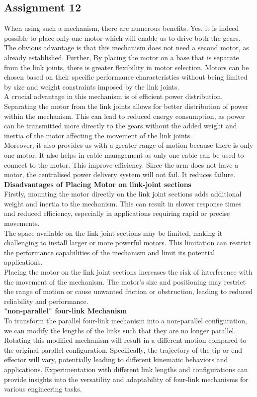 \documentclass[12pt,a4paper]{report}
\begin{document}
\subsection{\textbf{Assignment 12}}
When using such a mechanism, there are numerous benefits. Yes, it is indeed possible to place only one motor 
which will enable us to drive both the gears. \\
The obvious advantage is that this mechanism does not need a second motor, as already established. 
Further, By placing the motor on a base that is separate from the link joints, there is greater flexibility in motor selection. 
Motors can be chosen based on their specific performance characteristics without being limited by size and weight constraints 
imposed by the link joints. \\
A crucial advantage in this mechanism is of efficient power distribution. 
Separating the motor from the link joints allows for better distribution of power within the mechanism.
This can lead to reduced energy consumption, as power can be transmitted more directly to the gears without the added 
weight and inertia of the motor affecting the movement of the link joints.\\
Moreover, it also provides us with a greater range of motion because there is only one motor. It also helps in cable management as 
only one cable can be used to connect to the motor. This improve efficiency.
Since the arm does not have a motor, the centralised power delivery system will not fail. It reduces failure.\\
\textbf{Disadvantages of Placing Motor on link-joint sections}\\
Firstly, mounting the motor directly on the link joint sections adds additional weight and inertia to the mechanism. 
This can result in slower response times and reduced efficiency, especially in applications requiring rapid or precise movements.\\
The space available on the link joint sections may be limited, making it challenging to install larger or more powerful motors. 
This limitation can restrict the performance capabilities of the mechanism and limit its potential applications.\\
Placing the motor on the link joint sections increases the risk of interference with the movement of the mechanism. 
The motor's size and positioning may restrict the range of motion or cause unwanted friction or obstruction, leading to 
reduced reliability and performance.\\
\textbf{"non-parallel" four-link Mechanism}\\
To transform the parallel four-link mechanism into a non-parallel configuration, we can modify the lengths of the 
links such that they are no longer parallel. Rotating this modified mechanism will result in a different motion compared 
to the original parallel configuration. Specifically, the trajectory of the tip or end effector will vary, potentially leading 
to different kinematic behaviors and applications. Experimentation with different link lengths and configurations can provide 
insights into the versatility and adaptability of four-link mechanisms for various engineering tasks.\\
\end{document}
